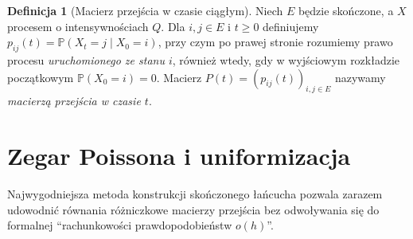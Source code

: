 \documentclass[11pt,a4paper,oneside]{report}
\numberwithin{equation}{chapter}
\theoremstyle{plain}
\theoremstyle{definition}
\newtheorem{definicja}{Definicja}[chapter]
\theoremstyle{remark}
\newcommand{\Prob}{\mathbb{P}}
\begin{document}
\begin{definicja}[Macierz przejścia w czasie ciągłym]
Niech $E$ będzie skończone, a $X$ procesem o intensywnościach
$Q$. Dla $i,j\in E$ i $t\ge0$ definiujemy
$p_{ij}(t)=\Prob(X_t=j\mid X_0=i)$,
przy czym po prawej stronie rozumiemy prawo procesu
\emph{uruchomionego ze stanu $i$}, również wtedy,
gdy w wyjściowym rozkładzie początkowym $\Prob(X_0=i)=0$.
Macierz $P(t)=(p_{ij}(t))_{i,j\in E}$ nazywamy
\emph{macierzą przejścia w czasie $t$}.
\end{definicja}

\section{Zegar Poissona i uniformizacja}
Najwygodniejsza metoda konstrukcji skończonego łańcucha
pozwala zarazem udowodnić równania różniczkowe macierzy
przejścia bez odwoływania się do formalnej ``rachunkowości
prawdopodobieństw $o(h)$''.
\end{document}
